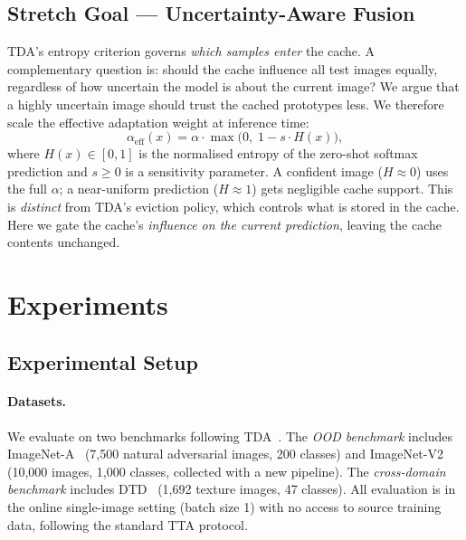 \documentclass[10pt,twocolumn,letterpaper]{article}
\begin{document}
\subsection{Stretch Goal --- Uncertainty-Aware Fusion}
\label{subsec:unc_method}

TDA's entropy criterion governs \emph{which samples enter} the cache.
A complementary question is: should the cache influence all test
images equally, regardless of how uncertain the model is about
the current image?
We argue that a highly uncertain image should trust the cached
prototypes less.
We therefore scale the effective adaptation weight at inference time:
\begin{equation}
  \alpha_\text{eff}(x) =
    \alpha \cdot \max\!\bigl(0,\; 1 - s \cdot H(x)\bigr),
\end{equation}
where $H(x) \in [0, 1]$ is the normalised entropy of the zero-shot
softmax prediction and $s \geq 0$ is a sensitivity parameter.
A confident image ($H \approx 0$) uses the full $\alpha$;
a near-uniform prediction ($H \approx 1$) gets negligible cache
support.
This is \emph{distinct} from TDA's eviction policy, which controls
what is stored in the cache.
Here we gate the cache's \emph{influence on the current prediction},
leaving the cache contents unchanged.

\section{Experiments}
\label{sec:exp}

\subsection{Experimental Setup}

\paragraph{Datasets.}
We evaluate on two benchmarks following TDA~\cite{karmanov2024tda}.
The \emph{OOD benchmark} includes ImageNet-A~\cite{hendrycks2021imageneta}
(7,500 natural adversarial images, 200 classes) and
ImageNet-V2~\cite{recht2019imagenetv2}
(10,000 images, 1,000 classes, collected with a new pipeline).
The \emph{cross-domain benchmark} includes
DTD~\cite{cimpoi2014dtd} (1,692 texture images, 47 classes).
All evaluation is in the online single-image setting (batch size 1)
with no access to source training data, following the standard TTA
protocol.
\end{document}
